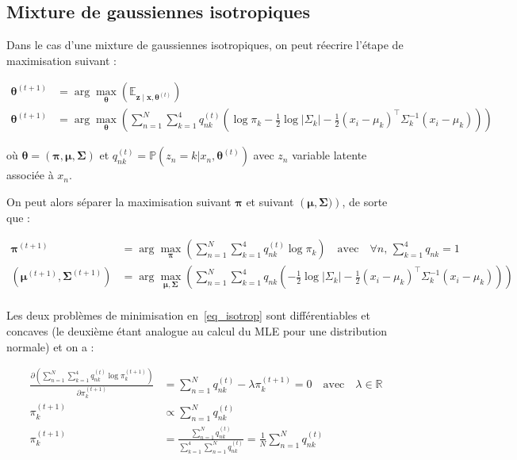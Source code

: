 \documentclass[12pt,a4paper,onecolumn]{article}
\begin{document}
\subsection{Mixture de gaussiennes isotropiques}

Dans le cas d'une mixture de gaussiennes isotropiques, on peut réecrire l'étape de maximisation suivant :

\begin{equation}
	\begin{split}
		\bm{\theta}^{(t + 1)} &= \operatorname{arg}\max_{\bm{\theta}}\left(\mathbb{E}_{\bm{z} \mid \bm{x}, \bm{\theta}^{(t)}}\right)\\
		\bm{\theta}^{(t + 1)} &= \operatorname{arg}\max_{\bm{\theta}}\left(\sum_{n = 1}^N\sum_{k = 1}^4q_{nk}^{(t)}\left(\log\pi_k -
		\frac{1}{2}\log|\Sigma_k|-\frac{1}{2}\left(x_i - \mu_k\right)^{\intercal}\Sigma_k^{-1}\left(x_i - \mu_k\right)\right)\right)
	\end{split}
\end{equation}

où \(\bm{\theta} = \left(\bm{\pi}, \bm{\mu}, \bm{\Sigma}\right)\) et \(q_{nk}^{(t)} = \mathbb{P}\left(z_n = k | x_n, \bm{\theta}^{(t)}\right)\) avec \(z_n\) variable latente associée à \(x_n\).

On peut alors séparer la maximisation suivant \(\bm{\pi}\) et suivant \(\left(\bm{\mu}, \bm{\Sigma})\right)\), de sorte que :

\begin{equation}
	\begin{split}
		\bm{\pi}^{(t + 1)} &= \operatorname{arg}\max_{\bm{\pi}}\left(\sum_{n = 1}^N\sum_{k = 1}^4q_{nk}^{(t)}\log\pi_k\right) \quad \text{avec}\quad\forall n,\,\sum_{k = 1}^4q_{nk} = 1\\
		(\bm{\mu}^{(t + 1)}, \bm{\Sigma}^{(t + 1)}) &= \operatorname{arg}\max_{\bm{\mu}, \bm{\Sigma}}\left(\sum_{n = 1}^N\sum_{k = 1}^4q_{nk}\left(
		-\frac{1}{2}\log|\Sigma_k|-\frac{1}{2}\left(x_i - \mu_k\right)^{\intercal}\Sigma_k^{-1}\left(x_i - \mu_k\right)\right)\right)\\
	\end{split}
	\label{eq_isotrop}
\end{equation}

Les deux problèmes de minimisation en~\eqref{eq_isotrop} sont différentiables et concaves (le deuxième étant analogue au calcul du MLE pour une distribution normale) et on a :

\begin{equation}
	\begin{split}
		\frac{\partial\left(\sum_{n = 1}^N\sum_{k = 1}^4q_{nk}^{(t)}\log\pi_k^{(t+1)}\right)}{\partial\pi_k^{(t+1)}} &= \sum_{n = 1}^Nq_{nk}^{(t)} - \lambda \pi_k^{(t+1)} = 0 \quad \text{avec} \quad \lambda \in \mathbb{R}\\
		\pi_k^{(t+1)} &\propto \sum_{n = 1}^Nq_{nk}^{(t)}\\
		\pi_k^{(t+1)} &= \frac{\sum_{n = 1}^Nq_{nk}^{(t)}}{\sum_{k = 1}^4\sum_{n = 1}^Nq_{nk}^{(t)}} = \frac{1}{N}\sum_{n = 1}^Nq_{nk}^{(t)}
	\end{split}
\end{equation}
\end{document}

